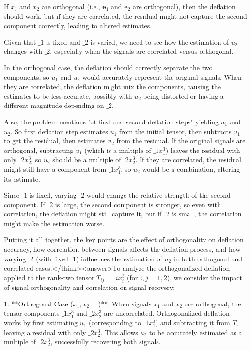 If \( x_1 \) and \( x_2 \) are orthogonal (i.e., \( \mathbf{e}_1 \) and \( \mathbf{e}_2 \) are orthogonal), then the deflation should work, but if they are correlated, the residual might not capture the second component correctly, leading to altered estimates.

Given that \( \_1 \) is fixed and \( \_2 \) is varied, we need to see how the estimation of \( u_2 \) changes with \( \_2 \), especially when the signals are correlated versus orthogonal.

In the orthogonal case, the deflation should correctly separate the two components, so \( u_1 \) and \( u_2 \) would accurately represent the original signals. When they are correlated, the deflation might mix the components, causing the estimates to be less accurate, possibly with \( u_2 \) being distorted or having a different magnitude depending on \( \_2 \).

Also, the problem mentions "at first and second deflation steps" yielding \( u_1 \) and \( u_2 \). So first deflation step estimates \( u_1 \) from the initial tensor, then subtracts \( u_1 \) to get the residual, then estimates \( u_2 \) from the residual. If the original signals are orthogonal, subtracting \( u_1 \) (which is a multiple of \( \_1 x_1^3 \)) leaves the residual with only \( \_2 x_2^3 \), so \( u_2 \) should be a multiple of \( \_2 x_2^3 \). If they are correlated, the residual might still have a component from \( \_1 x_1^3 \), so \( u_2 \) would be a combination, altering its estimate.

Since \( \_1 \) is fixed, varying \( \_2 \) would change the relative strength of the second component. If \( \_2 \) is large, the second component is stronger, so even with correlation, the deflation might still capture it, but if \( \_2 \) is small, the correlation might make the estimation worse.

Putting it all together, the key points are the effect of orthogonality on deflation accuracy, how correlation between signals affects the deflation process, and how varying \( \_2 \) (with fixed \( \_1 \)) influences the estimation of \( u_2 \) in both orthogonal and correlated cases.</think><answer>To analyze the orthogonalized deflation applied to the rank-two tensor \( T_{ij} = \_i x_i^3 \) (for \( i,j = 1,2 \)), we consider the impact of signal orthogonality and correlation on signal recovery:  

1. **Orthogonal Case (\( x_1, x_2 \perp \))**:  
   When signals \( x_1 \) and \( x_2 \) are orthogonal, the tensor components \( \_1 x_1^3 \) and \( \_2 x_2^3 \) are uncorrelated. Orthogonalized deflation works by first estimating \( u_1 \) (corresponding to \( \_1 x_1^3 \)) and subtracting it from \( T \), leaving a residual with only \( \_2 x_2^3 \). This allows \( u_2 \) to be accurately estimated as a multiple of \( \_2 x_2^3 \), successfully recovering both signals.  

